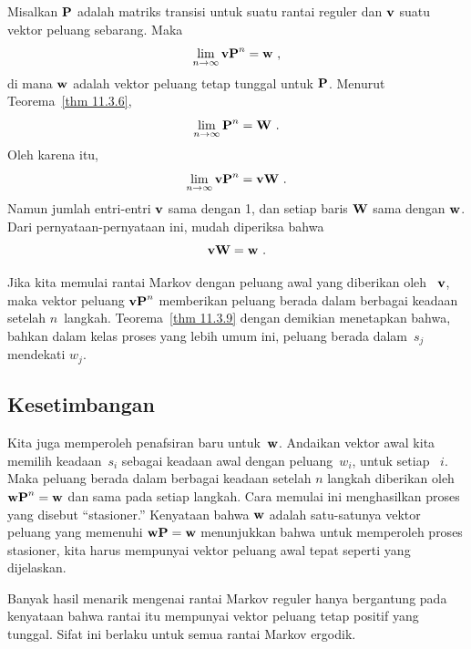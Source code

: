 \begin{theorem}\label{thm 11.3.9}
Misalkan ${\mbox{\bf P}\/}$ adalah matriks transisi untuk suatu rantai reguler dan
${\mbox{\bf v}\/}$ suatu vektor peluang sebarang. Maka
$$
\lim_{n \to \infty} {\mbox{\bf v}\/} {\mbox{\bf P}\/}^n = {\mbox{\bf w}\/}\ ,
$$
di mana ${\mbox{\bf w}\/}$ adalah vektor peluang tetap tunggal untuk ${\mbox{\bf P}\/}$.
\proof
Menurut Teorema~\ref{thm 11.3.6},
$$
\lim_{n \to \infty} \mat{P}^n = \mat {W}\ .
$$
Oleh karena itu,
$$
\lim_{n \to \infty} {\mbox{\bf v}\/} {\mbox{\bf P}\/}^n = {\mbox{\bf v}\/} {\mbox{\bf W}\/}\ .
$$
Namun jumlah entri-entri ${\mbox{\bf v}\/}$ sama dengan 1, dan setiap baris ${\mbox{\bf W}\/}$
sama dengan ${\mbox{\bf w}\/}$. Dari pernyataan-pernyataan ini, mudah diperiksa bahwa
$$
{\mbox{\bf v}\/} {\mbox{\bf W}\/} = {\mbox{\bf w}\/}\ .
$$
\end{theorem}

Jika kita memulai rantai Markov dengan peluang awal yang diberikan oleh
~${\mbox{\bf v}\/}$, maka vektor peluang ${\mbox{\bf v}\/} {\mbox{\bf P}\/}^n$ memberikan peluang berada
dalam berbagai keadaan setelah $n$~langkah. Teorema~\ref{thm 11.3.9} dengan
demikian menetapkan bahwa, bahkan dalam kelas proses yang lebih umum ini,
peluang berada dalam~$s_j$ mendekati $w_j$.

\subsection*{Kesetimbangan}
Kita juga memperoleh penafsiran baru untuk~${\mbox{\bf w}\/}$. Andaikan vektor awal kita
memilih keadaan~$s_i$ sebagai keadaan awal dengan peluang~$w_i$, untuk setiap
~$i$. Maka peluang berada dalam berbagai keadaan setelah $n$ langkah diberikan
oleh ${\mbox{\bf w}\/} {\mbox{\bf P}\/}^n = {\mbox{\bf w}\/}$ dan sama pada setiap langkah. Cara memulai
ini menghasilkan proses yang disebut ``stasioner.'' Kenyataan bahwa ${\mbox{\bf w}\/}$
adalah satu-satunya vektor peluang yang memenuhi ${\mbox{\bf w}\/} {\mbox{\bf P}\/} =
{\mbox{\bf w}\/}$ menunjukkan bahwa untuk memperoleh proses stasioner, kita harus
mempunyai vektor peluang awal tepat seperti yang dijelaskan.
\par
Banyak hasil menarik mengenai rantai Markov reguler hanya bergantung pada
kenyataan bahwa rantai itu mempunyai vektor peluang tetap positif yang tunggal.
Sifat ini berlaku untuk semua rantai Markov ergodik.

